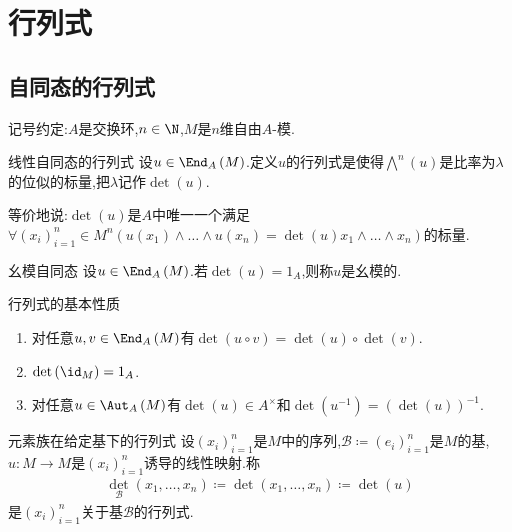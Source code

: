 \chapter{行列式}

\section{自同态的行列式}

记号约定:$A$是交换环,$n\in\N$,$M$是$n$维自由$A$-模.

\begin{definition}{线性自同态的行列式}{}
	设$u\in\End_{A}\left(M\right)$.定义$u$的行列式是使得$\bigwedge\limits^{n}\left(u\right)$是比率为$\lambda$的位似的标量,把$\lambda$记作$\det\left(u\right)$.
\end{definition}

\begin{remark}{}{}
	等价地说:$\det\left(u\right)$是$A$中唯一一个满足$\forall\left(x_{i}\right)_{i=1}^{n}\in M^{n}\left(u\left(x_{1}\right)\wedge\ldots\wedge u\left(x_{n}\right)=\det\left(u\right)x_{1}\wedge\ldots\wedge x_{n}\right)$的标量.
\end{remark}

\begin{definition}{幺模自同态}{}
	设$u\in\End_{A}\left(M\right)$.若$\det\left(u\right)=1_{A}$,则称$u$是幺模的.
\end{definition}

\begin{proposition}{行列式的基本性质}{}
	\begin{enumerate}
		\item 对任意$u,v\in\End_{A}\left(M\right)$有$\det\left(u\circ v\right)=\det\left(u\right)\circ\det\left(v\right)$.
		\item $\det\left(\id_{M}\right)=1_{A}$.
		\item 对任意$u\in\Aut_{A}\left(M\right)$有$\det\left(u\right)\in A^{\times}$和$\det\left(u^{-1}\right)=\left(\det\left(u\right)\right)^{-1}$.
	\end{enumerate}
\end{proposition}

\begin{definition}{元素族在给定基下的行列式}{}
	设$\left(x_{i}\right)_{i=1}^{n}$是$M$中的序列,$\mathcal{B}\coloneq\left(e_{i}\right)_{i=1}^{n}$是$M$的基,$u:M\to M$是$\left(x_{i}\right)_{i=1}^{n}$诱导的线性映射.称
	\begin{align*}
		\det_{\mathcal{B}}\left(x_{1},\ldots,x_{n}\right)\coloneq\det\left(x_{1},\ldots,x_{n}\right)\coloneq\det\left(u\right)
	\end{align*}
	是$\left(x_{i}\right)_{i=1}^{n}$关于基$\mathcal{B}$的行列式.
\end{definition}


